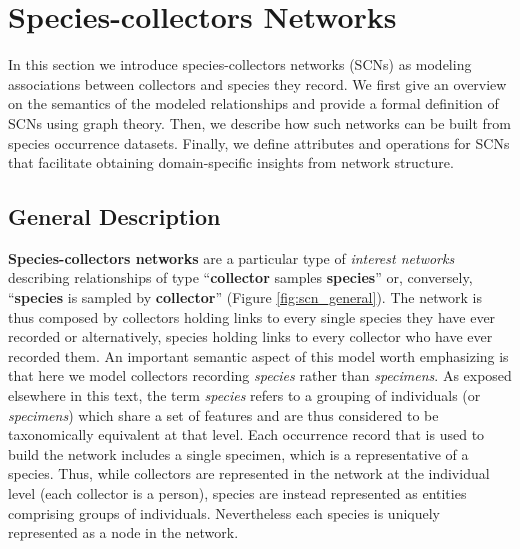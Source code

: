 {%

\section{Species-collectors Networks}

In this section we introduce species-collectors networks (SCNs) as modeling associations between collectors and species they record. 
We first give an overview on the semantics of the modeled relationships and provide a formal definition of SCNs using graph theory.
Then, we describe how such networks can be built from species occurrence datasets.
Finally, we define attributes and operations for SCNs that facilitate obtaining domain-specific insights from network structure.

\subsection{General Description}
\textbf{Species-collectors networks} are a particular type of \textit{interest networks} describing relationships of type ``\textbf{collector} samples \textbf{species}'' or, conversely, ``\textbf{species} is sampled by \textbf{collector}'' (Figure \ref{fig:scn_general}). 
The network is thus composed by collectors holding links to every single species they have ever recorded or alternatively, species holding links to every collector who have ever recorded them.
An important semantic aspect of this model worth emphasizing is that here we model collectors recording \textit{species} rather than \textit{specimens}. 
As exposed elsewhere in this text, the term \textit{species} refers to a grouping of individuals (or \textit{specimens}) which share a set of features and are thus considered to be taxonomically equivalent at that level. %
Each occurrence record that is used to build the network includes a single specimen, which is a representative of a species.
Thus, while collectors are represented in the network at the individual level (each collector is a person), species are instead represented as entities comprising groups of individuals.
Nevertheless each species is uniquely represented as a node in the network.

}
